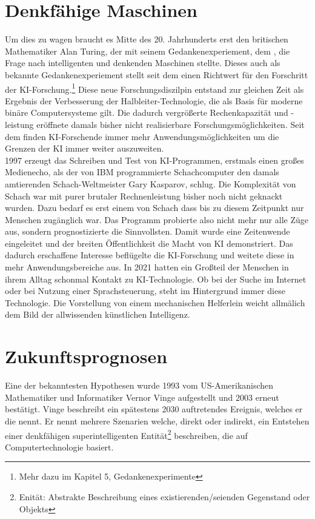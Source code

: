 \documentclass[12pt,german,ngerman]{report}
\begin{document}
    \section{Denkfähige Maschinen}
        Um dies zu wagen braucht es Mitte des 20. Jahrhunderts erst den britischen Mathematiker Alan Turing, 
        der mit seinem Gedankenexperiement, dem , 
        die Frage nach intelligenten und denkenden Maschinen stellte.
        Dieses auch als  bekannte Gedankenexperiement stellt seit dem einen 
        Richtwert für den Forschritt der KI-Forschung.\footnote{Mehr dazu im Kapitel 5, Gedankenexperimente}
        Diese neue Forschungsdiszilpin entstand zur gleichen Zeit als Ergebnis 
        der Verbesserung der Halbleiter-Technologie, die als Basis für 
        moderne binäre Computersysteme gilt. Die dadurch vergrößerte Rechenkapazität und -leistung 
        eröffnete damals bisher nicht realisierbare Forschungsmöglichkeiten. 
        Seit dem finden KI-Forschende immer mehr Anwendungsmöglichkeiten um die Grenzen der KI immer weiter auszuweiten.\\
        
        1997 erzeugt das Schreiben und Test von KI-Programmen, erstmals einen großes Medienecho, 
        als der von IBM programmierte Schachcomputer
         den damals amtierenden Schach-Weltmeister Gary Kasparov, schlug.\cite{chessbase2017kasparovdeepblue} 
        Die Komplexität von Schach war mit purer brutaler
        Rechnenleistung bisher noch nicht geknackt wurden. Dazu bedarf es erst einem  von Schach dass bis zu diesem
        Zeitpunkt nur Menschen zugänglich war. Das Programm probierte also nicht mehr nur alle Züge aus, sondern prognostizierte die 
        Sinnvollsten. Damit wurde eine Zeitenwende eingeleitet und der breiten Öffentlichkeit die Macht von KI demonstriert.
        Das dadurch erschaffene Interesse beflügelte die KI-Forschung und weitete diese in mehr Anwendungsbereiche aus.
        In 2021 hatten ein Großteil der Menschen in ihrem Alltag schonmal Kontakt zu KI-Technologie. 
        Ob bei der Suche im Internet oder bei Nutzung einer Sprachsteuerung, steht im Hintergrund immer diese Technologie.
        Die Vorstellung von einem mechanischen Helferlein weicht allmälich dem Bild der allwissenden künstlichen Intelligenz.
    \section{Zukunftsprognosen}
        Eine der bekanntesten Hypothesen wurde 1993 vom US-Amerikanischen Mathematiker und 
        Informatiker Vernor Vinge aufgestellt und 2003
        erneut bestätigt. Vinge beschreibt ein spätestens 2030 auftretendes Ereignis, 
        welches er die \cite[1]{vinge1993technological} nennt. 
        Er nennt mehrere Szenarien welche, direkt oder indirekt, 
        ein Entstehen einer denkfähigen superintelligenten Entität\footnote{Enität: Abstrakte Beschreibung eines existierenden/seienden Gegenstand oder Objekts}
        beschreiben, die auf Computertechnologie basiert.\\
        
\end{document}
